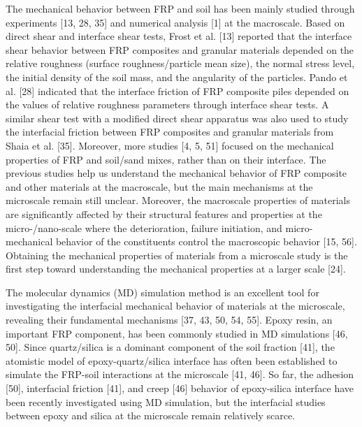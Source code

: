 \documentclass{article}
\begin{document}
The mechanical behavior between FRP and soil has been mainly studied through experiments [13, 28, 35] and numerical analysis [1] at the macroscale. Based on direct shear and interface shear tests, Frost et al. [13] reported that the interface shear behavior between FRP composites and granular materials depended on the relative roughness (surface roughness/particle mean size), the normal stress level, the initial density of the soil mass, and the angularity of the particles. Pando et al. [28] indicated that the interface friction of FRP composite piles depended on the values of relative roughness parameters through interface shear tests. A similar shear test with a modified direct shear apparatus was also used to study the interfacial friction between FRP composites and granular materials from Shaia et al. [35]. Moreover, more studies [4, 5, 51] focused on the mechanical properties of FRP and soil/sand mixes, rather than on their interface. The previous studies help us understand the mechanical behavior of FRP composite and other materials at the macroscale, but the main mechanisms at the microscale remain still unclear. Moreover, the macroscale properties of materials are significantly affected by their structural features and properties at the micro-/nano-scale where the deterioration, failure initiation, and micro-mechanical behavior of the constituents control the macroscopic behavior [15, 56]. Obtaining the mechanical properties of materials from a microscale study is the first step toward understanding the mechanical properties at a larger scale [24].

The molecular dynamics (MD) simulation method is an excellent tool for investigating the interfacial mechanical behavior of materials at the microscale, revealing their fundamental mechanisms [37, 43, 50, 54, 55]. Epoxy resin, an important FRP component, has been commonly studied in MD simulations [46, 50]. Since quartz/silica is a dominant component of the soil fraction [41], the atomistic model of epoxy-quartz/silica interface has often been established to simulate the FRP-soil interactions at the microscale [41, 46]. So far, the adhesion [50], interfacial friction [41], and creep [46] behavior of epoxy-silica interface have been recently investigated using MD simulation, but the interfacial studies between epoxy and silica at the microscale remain relatively scarce.
\end{document}
